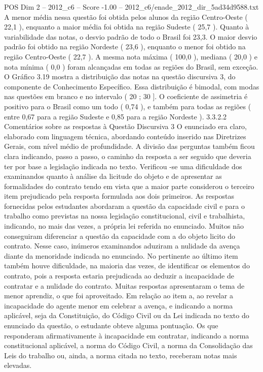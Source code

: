 \begin{textsample}{POS Dim 2 – 2012\_c6 – Score -1.00 – 2012\_c6/enade\_2012\_dir\_5ad34d9588.txt}
A menor média nessa questão foi obtida pelos alunos da região Centro-Oeste ( 22,1 ), enquanto a maior média foi obtida na região Sudeste ( 25,7 ).
Quanto à variabilidade das notas, o desvio padrão de todo o Brasil foi 23,3.
O maior desvio padrão foi obtido na região Nordeste ( 23,6 ), enquanto o menor foi obtido na região Centro-Oeste ( 22,7 ).
A mesma nota máxima ( 100,0 ), mediana ( 20,0 ) e nota mínima ( 0,0 ) foram alcançadas em todas as regiões do Brasil, sem exceção.
O Gráfico 3.19 mostra a distribuição das notas na questão discursiva 3, do componente de Conhecimento Específico.
Essa distribuição é bimodal, com modas nas questões em branco e no intervalo ( 20 ; 30 ].
O coeficiente de assimetria é positivo para o Brasil como um todo ( 0,74 ), e também para todas as regiões ( entre 0,67 para a região Sudeste e 0,85 para a região Nordeste ). 3.3.2.2 Comentários sobre as respostas à Questão Discursiva 3 O enunciado era claro, elaborado com linguagem técnica, abordando conteúdo inserido nas Diretrizes Gerais, com nível médio de profundidade.
A divisão das perguntas também ficou clara indicando, passo a passo, o caminho da resposta a ser seguido que deveria ter por base a legislação indicada no texto.
Verificou -se uma dificuldade dos examinandos quanto à análise da licitude do objeto e de apresentar as formalidades do contrato tendo em vista que a maior parte considerou o terceiro item prejudicado pela resposta formulada aos dois primeiros.
As respostas fornecidas pelos estudantes abordaram a questão da capacidade civil e para o trabalho como previstas na nossa legislação constitucional, civil e trabalhista, indicando, no mais das vezes, a própria lei referida no enunciado.
Muitos não conseguiram diferenciar a questão da capacidade com a do objeto licito do contrato.
Nesse caso, inúmeros examinandos aduziram a nulidade da avença diante da menoridade indicada no enunciado.
No pertinente ao último item também houve dificuldade, na maioria das vezes, de identificar os elementos do contrato, pois a resposta estaria prejudicada ao deduzir a incapacidade de contratar e a nulidade do contrato.
Muitas respostas apresentaram o tema de menor aprendiz, o que foi aproveitado.
Em relação ao item a, ao revelar a incapacidade do agente menor em celebrar a avença, e indicando a norma aplicável, seja da Constituição, do Código Civil ou da Lei indicada no texto do enunciado da questão, o estudante obteve alguma pontuação.
Os que responderam afirmativamente à incapacidade em contratar, indicando a norma constitucional aplicável, a norma do Código Civil, a norma da Consolidação das Leis do trabalho ou, ainda, a norma citada no texto, receberam notas mais elevadas.

\end{textsample}
